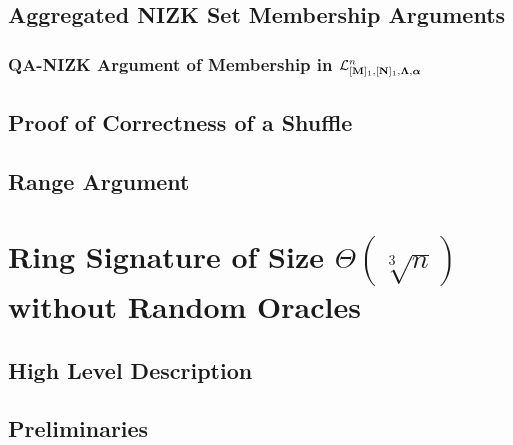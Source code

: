     \section{Aggregated NIZK Set Membership Arguments} \label{sec:aZKSMP}

        

        \subsection{QA-NIZK Argument of Membership in $\mathcal{L}_{[\mathbf{{M}}]_1,[\mathbf{{N}}]_1,\mathbf{{\Lambda}},{\boldsymbol \alpha}}^n$} \label{sec:bin-lan-constr}

            

    \section{Proof of Correctness of a Shuffle} \label{sec:shuffle}

        

    \section{Range Argument} \label{sec:range-proof}

        


%    

\chapter{Ring Signature of Size $\Theta(\sqrt[3]{n})$ without Random O\-ra\-cles} \label{sec:opt-rs}

    
    
    \section{High Level Description}
        

    \section{Preliminaries}
        

